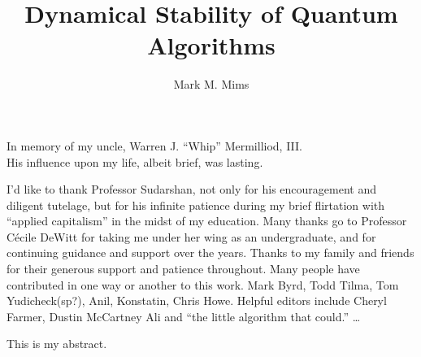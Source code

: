 \documentclass[12pt]{report} %
\author{Mark M. Mims}  %
\title{Dynamical Stability of Quantum Algorithms}
\theoremstyle{definition}
\theoremstyle{remark}
\begin{document}
\copyrightpage                  %

\titlepage                      %

\signaturepage                  %


\begin{dedication}              %
%
In memory of my uncle, Warren J. ``Whip'' Mermilliod, III.  \\
His influence upon my life, albeit brief, was lasting.
\end{dedication}


\begin{acknowledgments}

I'd like to thank Professor Sudarshan, not only 
for his encouragement and diligent tutelage, but for his 
infinite patience during my brief flirtation with 
``applied capitalism'' in the midst of my education.
%
Many thanks go to Professor C\'ecile DeWitt for taking
me under her wing as an undergraduate, and for 
continuing guidance and support over the years.
%
Thanks to my family and friends for
their generous support and patience throughout.
%
Many people have contributed in one way or another
to this work.  
Mark Byrd,
Todd Tilma,
Tom Yudicheck(sp?),
Anil,
Konstatin,
Chris Howe.
Helpful editors include
Cheryl Farmer,
Dustin McCartney
Ali and ``the little algorithm that could.''
\dots
\end{acknowledgments}

\utabstract       %

This is my abstract.


\tableofcontents        %

\listoftables           %

\listoffigures          %











%

\end{document}
